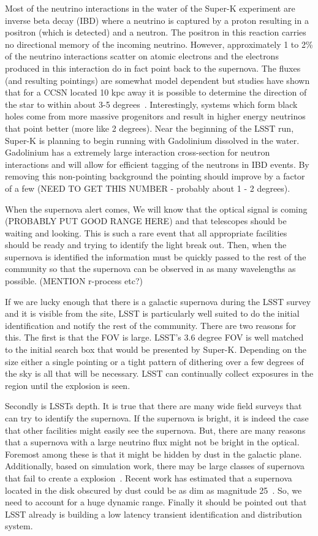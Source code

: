 \documentclass[11pt]{article}
\newcommand{\superk}  {Super\nobreakdash-K\xspace}
\begin{document}
Most of the neutrino interactions in the water of the \superk
experiment are inverse beta decay (IBD) where a neutrino is captured
by a proton resulting in a positron (which is detected) and a neutron.
The positron in this reaction carries no directional memory of the
incoming neutrino.  However, approximately 1 to 2\% of the neutrino
interactions scatter on atomic electrons and the electrons produced in
this interaction do in fact point back to the supernova.  The fluxes
(and resulting pointings) are somewhat model dependent but studies
have shown that for a CCSN located 10 kpc away it is possible to
determine the direction of the star to within about 3-5
degrees~\cite{2016APh....81...39A}.  Interestingly, systems which form black
holes come from more massive progenitors and result in higher energy
neutrinos that point better (more like 2 degrees).  Near the beginning
of the LSST run, \superk is planning to begin running with
Gadolinium dissolved in the water.  Gadolinium has a extremely large
interaction cross-section for neutron interactions and will allow for
efficient tagging of the neutrons in IBD events.  By removing this
non-pointing background the pointing should improve by a factor of a
few (NEED TO GET THIS NUMBER - probably about 1 - 2 degrees).

When the supernova alert comes,  We will know that the optical signal
is coming (PROBABLY PUT GOOD RANGE HERE) and that telescopes should be
waiting and looking.  This is such a rare event that all appropriate
facilities should be ready and trying to identify the light break
out.  Then, when the supernova is identified the information must be
quickly passed to the rest of the community so that the supernova can
be observed in as many wavelengths as possible. (MENTION r-process etc?)

If we are lucky enough that there is a galactic supernova during the
LSST survey and it is visible from the site, LSST is particularly well
suited to do the initial identification and notify the rest of the
community.  There are two reasons for this.  The first is that the FOV
is large. LSST's 3.6 degree FOV is well matched to the initial search
box that would be presented by \superk.  Depending on the
size either a single pointing or a tight pattern of dithering over a
few degrees of the sky is all that will be necessary.  LSST can
continually collect exposures in the region until the explosion is
seen.

Secondly is LSSTs depth. It is true that there are many wide field
surveys that can try to identify the supernova.  If the supernova is
bright, it is indeed the case that other facilities might easily see
the supernova.  But, there are many reasons that a supernova with a
large neutrino flux might not be bright in the optical.  Foremost
among these is that it might be hidden by dust in the galactic plane.
Additionally, based on simulation work, there may be large classes of
supernova that fail to create a explosion~\cite{Evanpaper}. Recent
work has estimated that a supernova located in the disk obscured by
dust could be as dim as magnitude 25~\cite{2016MNRAS.461.3296N}.
So, we need to account for a huge dynamic range.  Finally it should be
pointed out that LSST already is building a low latency transient
identification and distribution system.
\end{document}
